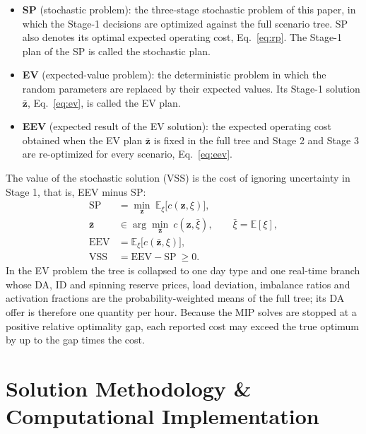 \documentclass[5p,times,twocolumn]{elsarticle}
\begin{document}
\begin{itemize}
\item \textbf{SP} (stochastic problem): the three-stage stochastic problem of this paper, in which the Stage-1 decisions are optimized against the full scenario tree. SP also denotes its optimal expected operating cost, Eq.~\eqref{eq:rp}. The Stage-1 plan of the SP is called the stochastic plan.
\item \textbf{EV} (expected-value problem): the deterministic problem in which the random parameters are replaced by their expected values. Its Stage-1 solution $\bar{\mathbf{z}}$, Eq.~\eqref{eq:ev}, is called the EV plan.
\item \textbf{EEV} (expected result of the EV solution): the expected operating cost obtained when the EV plan $\bar{\mathbf{z}}$ is fixed in the full tree and Stage 2 and Stage 3 are re-optimized for every scenario, Eq.~\eqref{eq:eev}.
\end{itemize}
The value of the stochastic solution (VSS) is the cost of ignoring uncertainty in Stage 1, that is, EEV minus SP:
\begin{align}
\mathrm{SP} &= \min_{\mathbf{z}}\ \mathbb{E}_\xi\big[c(\mathbf{z},\xi)\big], \label{eq:rp}\\
\bar{\mathbf{z}} &\in \arg\min_{\mathbf{z}}\ c(\mathbf{z},\bar\xi), \qquad \bar\xi=\mathbb{E}[\xi], \label{eq:ev}\\
\mathrm{EEV} &= \mathbb{E}_\xi\big[c(\bar{\mathbf{z}},\xi)\big], \label{eq:eev}\\
\mathrm{VSS} &= \mathrm{EEV}-\mathrm{SP}\ \ge 0. \label{eq:vss}
\end{align}
In the EV problem the tree is collapsed to one day type and one real-time branch whose DA, ID and spinning reserve prices, load deviation, imbalance ratios and activation fractions are the probability-weighted means of the full tree; its DA offer is therefore one quantity per hour. Because the MIP solves are stopped at a positive relative optimality gap, each reported cost may exceed the true optimum by up to the gap times the cost. 

\section{Solution Methodology \& Computational Implementation}
\label{sec:method}
\end{document}
